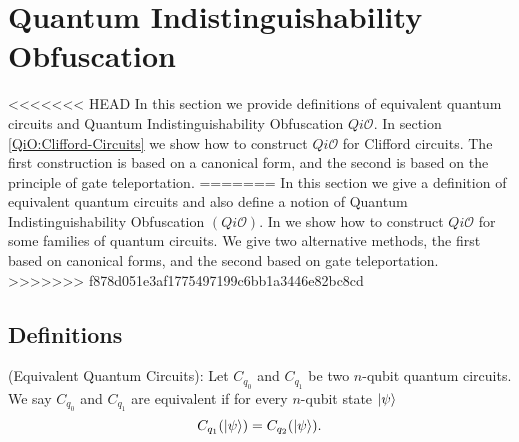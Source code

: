 
\section{Quantum Indistinguishability Obfuscation}
\label{sec:QiO-Cliffords and more}
<<<<<<< HEAD
In this section we provide definitions of equivalent quantum circuits and  Quantum Indistinguishability Obfuscation $Qi\mathcal{O}.$ In section \ref{QiO:Clifford-Circuits} we show how to construct $Qi\mathcal{O}$ for Clifford circuits. The first construction is based on a canonical form, and the second is based on the principle of gate teleportation.
=======
In this section we give a definition of equivalent quantum circuits and also define a notion of Quantum Indistinguishability Obfuscation $(Qi\mathcal{O})$. In   we show how to construct $Qi\mathcal{O}$ for some families of quantum circuits. We give two alternative methods, the first based on canonical forms, and the second based on gate teleportation.
>>>>>>> f878d051e3af1775497199c6bb1a3446e82bc8cd


\subsection{Definitions}
\label{def:equivalent-circuits}
\begin{definition} {\rm (Equivalent Quantum Circuits):}
Let $C_{q_0}$ and $C_{q_1}$ be two $n$-qubit quantum circuits. We say $C_{q_0}$ and $C_{q_1}$ are equivalent if for every $n$-qubit state ${\lvert}\psi\rangle$
$$C_{q_1}({\lvert}\psi\rangle) =C_{q_2}({\lvert}\psi\rangle).$$
\end{definition}

